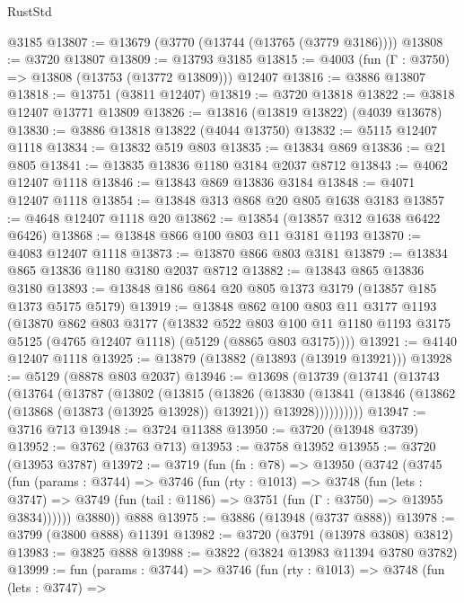 \begin{lexlean}{RustStd}
\begin{coremodule}
    @3185
@13807 := @13679 (@3770 (@13744 (@13765 (@3779 @3186))))
@13808 := @3720 @13807
@13809 := @13793 @3185
@13815 := @4003 (fun (Γ : @3750) => @13808 (@13753 (@13772 @13809))) @12407
@13816 := @3886 @13807
@13818 := @13751 (@3811 @12407)
@13819 := @3720 @13818
@13822 := @3818 @12407 @13771 @13809
@13826 := @13816 (@13819 @13822) (@4039 @13678)
@13830 := @3886 @13818 @13822 (@4044 @13750)
@13832 := @5115 @12407 @1118
@13834 := @13832 @519 @803
@13835 := @13834 @869
@13836 := @21 @805
@13841 := @13835 @13836 @1180 @3184 @2037 @8712
@13843 := @4062 @12407 @1118
@13846 := @13843 @869 @13836 @3184
@13848 := @4071 @12407 @1118
@13854 := @13848 @313 @868 @20 @805 @1638 @3183
@13857 := @4648 @12407 @1118 @20
@13862 := @13854 (@13857 @312 @1638 @6422 @6426)
@13868 := @13848 @866 @100 @803 @11 @3181 @1193
@13870 := @4083 @12407 @1118
@13873 := @13870 @866 @803 @3181
@13879 := @13834 @865 @13836 @1180 @3180 @2037 @8712
@13882 := @13843 @865 @13836 @3180
@13893 := @13848 @186 @864 @20 @805 @1373 @3179 (@13857 @185 @1373 @5175 @5179)
@13919 := @13848
    @862
    @100
    @803
    @11
    @3177
    @1193
    (@13870
      @862
      @803
      @3177
      (@13832
        @522
        @803
        @100
        @11
        @1180
        @1193
        @3175
        @5125
        (@4765 @12407 @1118)
        (@5129 (@8865 @803 @3175))))
@13921 := @4140 @12407 @1118
@13925 := @13879 (@13882 (@13893 (@13919 @13921)))
@13928 := @5129 (@8878 @803 @2037)
@13946 := @13698
    (@13739
      (@13741
        (@13743
          (@13764
            (@13787
              (@13802
                (@13815
                  (@13826
                    (@13830
                      (@13841
                        (@13846 (@13862 (@13868 (@13873 (@13925 @13928)) @13921)))
                        @13928))))))))))
@13947 := @3716 @713
@13948 := @3724 @11388
@13950 := @3720 (@13948 @3739)
@13952 := @3762 (@3763 @713)
@13953 := @3758 @13952
@13955 := @3720 (@13953 @3787)
@13972 := @3719
    (fun (fn : @78) =>
    @13950
      (@3742
        (@3745
          (fun (params : @3744) =>
          @3746
            (fun (rty : @1013) =>
            @3748
              (fun (lets : @3747) =>
              @3749 (fun (tail : @1186) => @3751 (fun (Γ : @3750) => @13955 @3834))))))
        @3880))
    @888
@13975 := @3886 (@13948 (@3737 @888))
@13978 := @3799 (@3800 @888) @11391
@13982 := @3720 (@3791 (@13978 @3808) @3812)
@13983 := @3825 @888
@13988 := @3822 (@3824 @13983 @11394 @3780 @3782)
@13999 := fun (params : @3744) =>
  @3746
    (fun (rty : @1013) =>
    @3748
      (fun (lets : @3747) =>

\end{coremodule}
\end{lexlean}
